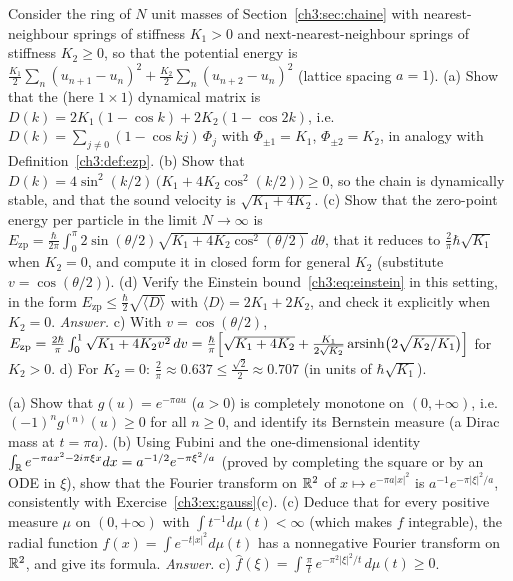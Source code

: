 \begin{exercise}
Consider the ring of $N$ unit masses of Section~\ref{ch3:sec:chaine} with nearest-neighbour springs of stiffness $K_1>0$
and next-nearest-neighbour springs of stiffness $K_2\ge0$, so that the potential energy is
$\tfrac{K_1}2\sum_n(u_{n+1}-u_n)^2+\tfrac{K_2}2\sum_n(u_{n+2}-u_n)^2$ (lattice spacing $a=1$).
(a) Show that the (here $1\times1$) dynamical matrix is
$D(k)=2K_1(1-\cos k)+2K_2(1-\cos2k)$, i.e.\ $D(k)=\sum_{j\ne0}(1-\cos kj)\,\Phi_j$ with $\Phi_{\pm1}=K_1$,
$\Phi_{\pm2}=K_2$, in analogy with Definition~\ref{ch3:def:ezp}.
(b) Show that $D(k)=4\sin^2(k/2)\,\bigl(K_1+4K_2\cos^2(k/2)\bigr)\ge0$, so the chain is dynamically stable, and that the
sound velocity is $\sqrt{K_1+4K_2}$.
(c) Show that the zero-point energy per particle in the limit $N\to\infty$ is
$E_{\mathrm{zp}}=\frac{\hbar}{2\pi}\int_0^{\pi}2\sin(\theta/2)\sqrt{K_1+4K_2\cos^2(\theta/2)}\,d\theta$, that it reduces
to $\tfrac2\pi\hbar\sqrt{K_1}$ when $K_2=0$, and compute it in closed form for general $K_2$ (substitute
$v=\cos(\theta/2)$).
(d) Verify the Einstein bound~\eqref{ch3:eq:einstein} in this setting, in the form
$E_{\mathrm{zp}}\le\tfrac\hbar2\sqrt{\langle D\rangle}$ with $\langle D\rangle=2K_1+2K_2$, and check it explicitly when $K_2=0$.
\emph{Answer.} c) With $v=\cos(\theta/2)$, $E_{\mathrm{zp}}=\frac{2\hbar}{\pi}\int_0^1\sqrt{K_1+4K_2v^2}\,dv
=\frac{\hbar}{\pi}\Bigl[\sqrt{K_1+4K_2}+\frac{K_1}{2\sqrt{K_2}}\operatorname{arsinh}\bigl(2\sqrt{K_2/K_1}\bigr)\Bigr]$
for $K_2>0$. d) For $K_2=0$: $\frac2\pi\approx0.637\le\frac{\sqrt2}2\approx0.707$ (in units of $\hbar\sqrt{K_1}$).
\end{exercise}

\begin{exercise}
(a) Show that $g(u)=e^{-\pi au}$ ($a>0$) is completely monotone on $(0,+\infty)$, i.e.\ $(-1)^ng^{(n)}(u)\ge0$ for all
$n\ge0$, and identify its Bernstein measure (a Dirac mass at $t=\pi a$).
(b) Using Fubini and the one-dimensional identity $\int_{\mathbb{R}} e^{-\pi ax^2-2i\pi\xi x}dx=a^{-1/2}e^{-\pi\xi^2/a}$
(proved by completing the square or by an ODE in $\xi$), show that the Fourier transform on $\mathbb{R}^2$ of
$x\mapsto e^{-\pi a|x|^2}$ is $a^{-1}e^{-\pi|\xi|^2/a}$, consistently with Exercise~\ref{ch3:ex:gauss}(c).
(c) Deduce that for every positive measure $\mu$ on $(0,+\infty)$ with $\int t^{-1}d\mu(t)<\infty$ (which makes $f$
integrable), the radial function
$f(x)=\int e^{-t|x|^2}d\mu(t)$ has a nonnegative Fourier transform on $\mathbb{R}^2$, and give its formula.
\emph{Answer.} c) $\hat f(\xi)=\int\frac{\pi}{t}\,e^{-\pi^2|\xi|^2/t}\,d\mu(t)\ge0$.
\end{exercise}

\label{ch3:fin}

